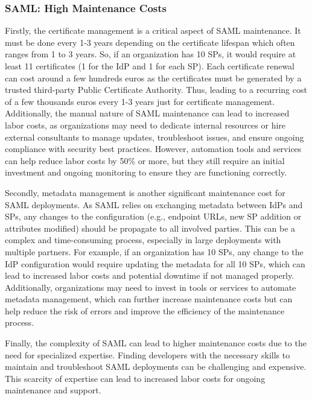 \documentclass[../memoire.tex]{subfiles}
\begin{document}
\subsubsection{SAML: High Maintenance Costs}

Firstly, the certificate management is a critical aspect of SAML maintenance. It must be done every 1-3 years depending on the certificate lifespan which often ranges from 1 to 3 years\cite{workos}. So, if an organization has 10 SPs, it would require at least 11 certificates (1 for the IdP and 1 for each SP). Each certificate renewal can cost around a few hundreds euros as the certificates must be generated by a trusted third-party Public Certificate Authority. Thus, leading to a recurring cost of a few thousands euros every 1-3 years just for certificate management. Additionally, the manual nature of SAML maintenance can lead to increased labor costs, as organizations may need to dedicate internal resources or hire external consultants to manage updates, troubleshoot issues, and ensure ongoing compliance with security best practices. However, automation tools and services can help reduce labor costs by 50\% or more, but they still require an initial investment and ongoing monitoring to ensure they are functioning correctly.

Secondly, metadata management is another significant maintenance cost for SAML deployments. As SAML relies on exchanging metadata between IdPs and SPs, any changes to the configuration (e.g., endpoint URLs, new SP addition or attributes modified) should be propagate to all involved parties. This can be a complex and time-consuming process, especially in large deployments with multiple partners. For example, if an organization has 10 SPs, any change to the IdP configuration would require updating the metadata for all 10 SPs, which can lead to increased labor costs and potential downtime if not managed properly. Additionally, organizations may need to invest in tools or services to automate metadata management, which can further increase maintenance costs but can help reduce the risk of errors and improve the efficiency of the maintenance process.

Finally, the complexity of SAML can lead to higher maintenance costs due to the need for specialized expertise. Finding developers with the necessary skills to maintain and troubleshoot SAML deployments can be challenging and expensive. This scarcity of expertise can lead to increased labor costs for ongoing maintenance and support. 
\end{document}
